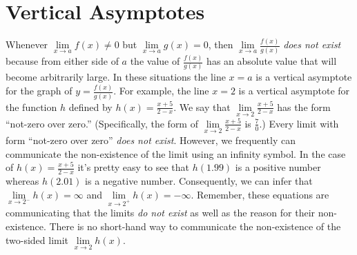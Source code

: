 \documentclass[12pt,]{book}
\theoremstyle{plain}
\theoremstyle{definition}
\theoremstyle{definition}
\theoremstyle{definition}
\theoremstyle{definition}
\theoremstyle{definition}
\numberwithin{equation}{section}
\newcommand{\fe}[2]{#1\mathopen{}\left(#2\right)\mathclose{}}
\begin{document}
\section[{Vertical Asymptotes}]{Vertical Asymptotes}\label{section-vertical-asymptotes}
Whenever \(\lim\limits_{x\to a}\fe{f}{x}\neq0\) but \(\lim\limits_{x\to a}\fe{g}{x}=0\), then \(\lim\limits_{x\to a}\frac{\fe{f}{x}}{\fe{g}{x}}\) \emph{does not exist} because from either side of \(a\) the value of \(\frac{\fe{f}{x}}{\fe{g}{x}}\) has an absolute value that will become arbitrarily large. In these situations the line \(x=a\) is a vertical asymptote for the graph of \(y=\frac{\fe{f}{x}}{\fe{g}{x}}\). For example, the line \(x=2\) is a vertical asymptote for the function \(h\) defined by \(\fe{h}{x}=\frac{x+5}{2-x}\). We say that \(\lim\limits_{x\to 2}\frac{x+5}{2-x}\) has the form ``not-zero over zero.'' (Specifically, the form of \(\lim\limits_{x\to 2}\frac{x+5}{2-x}\) is \(\frac{7}{0}\).) Every limit with form ``not-zero over zero'' \emph{does not exist}. However, we frequently can communicate the non-existence of the limit using an infinity symbol. In the case of \(\fe{h}{x}=\frac{x+5}{2-x}\) it's pretty easy to see that \(\fe{h}{1.99}\) is a positive number whereas \(\fe{h}{2.01}\) is a negative number. Consequently, we can infer that \(\lim\limits_{x\to 2^{-}}\fe{h}{x}=\infty\) and \(\lim\limits_{x\to 2^{+}}\fe{h}{x}=-\infty\). Remember, these equations are communicating that the limits \emph{do not exist} as well as the reason for their non-existence. There is no short-hand way to communicate the non-existence of the two-sided limit \(\lim\limits_{x\to 2}\fe{h}{x}\).%
\typeout{************************************************}
\typeout{************************************************}
\end{document}
